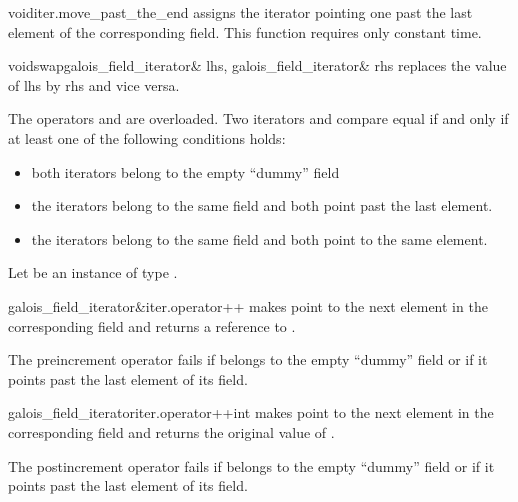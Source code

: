 \begin{fcode}{void}{iter.move_past_the_end}{}
  assigns the iterator pointing one past the last element of the corresponding
  field. This function requires only constant time.
\end{fcode}

\begin{fcode}{void}{swap}{galois_field_iterator& lhs,
    galois_field_iterator& rhs}
  replaces the value of lhs by rhs and vice versa.
\end{fcode}


\COMP

The operators \code{==} and \code{!=} are overloaded. Two iterators
 and  compare equal if and only if at least
one of the following conditions holds:
\begin{itemize}
\item both iterators belong to the empty ``dummy'' field
\item the iterators belong to the same field and both point past the last
  element. 
\item the iterators belong to the same field and both point to the same
  element. 
\end{itemize}


\BASIC

Let  be an instance of type .

\begin{fcode}{galois_field_iterator&}{iter.operator++}{}
   makes  point to the next element in
  the corresponding field and returns a reference to .

  The preincrement operator fails if  belongs to the empty
  ``dummy'' field or if it points past the last element of its field.
\end{fcode}

\begin{fcode}{galois_field_iterator}{iter.operator++}{int}
   makes  point to the next element in
  the corresponding field and returns the original value of .

  The postincrement operator fails if  belongs to the empty
  ``dummy'' field or if it points past the last element of its field.
\end{fcode}

